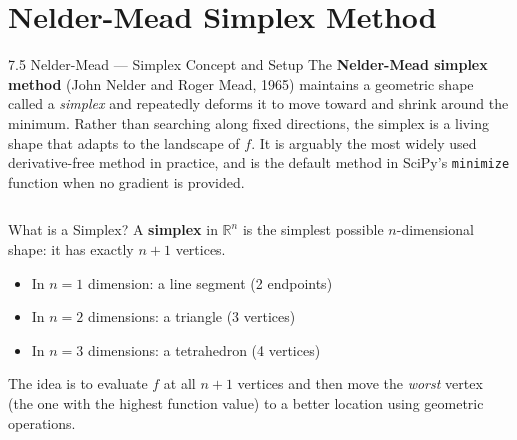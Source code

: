 \documentclass[aspectratio=169,10pt]{beamer}
\begin{document}
\section{Nelder-Mead Simplex Method}

\begin{frame}[allowframebreaks]{7.5 Nelder-Mead --- Simplex Concept and Setup}
  The \textbf{Nelder-Mead simplex method} (John Nelder and Roger
  Mead, 1965) maintains a geometric shape called a \emph{simplex}
  and repeatedly deforms it to move toward and shrink around the
  minimum.  Rather than searching along fixed directions, the simplex
  is a living shape that adapts to the landscape of $f$.  It is
  arguably the most widely used derivative-free method in practice,
  and is the default method in SciPy's \texttt{minimize} function when
  no gradient is provided.

  \begin{columns}[T]
      \begin{block}{What is a Simplex?}
        A \textbf{simplex} in $\mathbb{R}^n$ is the simplest possible
        $n$-dimensional shape: it has exactly $n+1$ vertices.
        \begin{itemize}\setlength\itemsep{2pt}
          \item In $n=1$ dimension: a line segment (2 endpoints)
          \item In $n=2$ dimensions: a triangle (3 vertices)
          \item In $n=3$ dimensions: a tetrahedron (4 vertices)
        \end{itemize}
        The idea is to evaluate $f$ at all $n+1$ vertices and then
        move the \emph{worst} vertex (the one with the highest function
        value) to a better location using geometric operations.
      \end{block}


\end{columns}
\end{frame}
\end{document}
